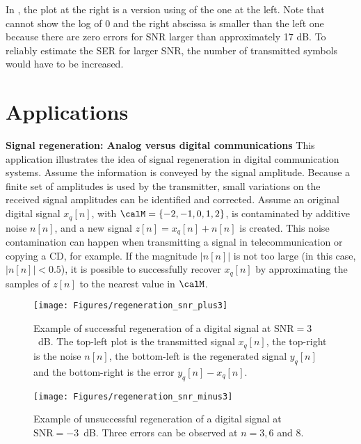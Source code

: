 In , the plot at the right is a version using  of the one at the left. Note that {\matlab} cannot show the log of 0 and the right abscissa is smaller than the left one because there are zero errors for SNR larger than approximately 17 dB. To reliably estimate the SER for larger SNR, the number of transmitted symbols would have to be increased.

\section{Applications}

\bApplication \textbf{Signal regeneration: Analog versus digital communications}
\label{app:signalsadcomm}
This application illustrates the idea of signal regeneration in digital communication systems. Assume the information is conveyed by the signal amplitude. Because a finite set of amplitudes is used by the transmitter, small variations on the received signal amplitudes can be identified and corrected. Assume an original digital signal $x_q[n]$, with $\calM=\{-2,-1,0,1,2\}$, is contaminated by additive noise $n[n]$, and a new signal $z[n]=x_q[n]+n[n]$ is created. This noise contamination can happen when transmitting a signal in telecommunication or copying a CD, for example. If the magnitude $\lvert n[n]\rvert$ is not too large (in this case, $\lvert n[n]\rvert<0.5$), it is possible to successfully recover $x_q[n]$ by approximating the samples of $z[n]$ to the nearest value in $\calM$.

\begin{figure}[htbp]
	\centering
		\texttt{[image: Figures/regeneration\_snr\_plus3]}		
	\caption[Example of successful regeneration of a digital signal at $\text{SNR}=3$~dB]{Example of successful regeneration of a digital signal at $\text{SNR}=3$~dB. The top-left plot is the transmitted signal $x_q[n]$, the top-right is the noise $n[n]$, the bottom-left is the regenerated signal $y_q[n]$ and the bottom-right is the error $y_q[n]-x_q[n]$.\label{fig:regeneration_snr_plus3}}
\end{figure}

\begin{figure}[htbp]
	\centering
		\texttt{[image: Figures/regeneration\_snr\_minus3]}		
	\caption[{Example of unsuccessful regeneration of a digital signal at $\text{SNR}=-3$~dB.}]{Example of unsuccessful regeneration of a digital signal at $\text{SNR}=-3$~dB. Three errors can be observed at $n=3, 6$ and 8.
	\label{fig:regenerationsnrminus3}}
\end{figure}

